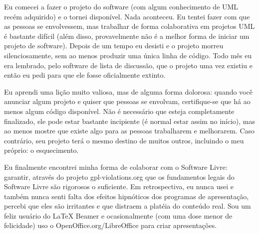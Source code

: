 Eu comecei a fazer o projeto do software (com algum conhecimento de UML recém adquirido)
e o tornei disponível. Nada aconteceu. Eu tentei fazer com que as pessoas se envolvessem,
mas trabalhar de forma colaborativa em projetos UML é bastante difícil (além disso,
provavelmente não é a melhor forma de iniciar um projeto de software). Depois de um
tempo eu desisti e o projeto morreu silenciosamente, sem ao menos produzir uma única
linha de código. Todo mês eu era lembrado, pelo software de lista de discussão, que
o projeto uma vez existiu e então eu pedi para que ele fosse oficialmente extinto.

Eu aprendi uma lição muito valiosa, mas de alguma forma dolorosa: quando você
anunciar algum projeto e quiser que pessoas se envolvam, certifique-se que há
ao menos algum código disponível. Não é necessário que esteja completamente finalizado,
ele pode estar bastante incipiente (é normal estar assim no início), mas ao menos
mostre que existe algo para as pessoas trabalharem e melhorarem. Caso contrário, seu
projeto terá o mesmo destino de muitos outros, incluindo o meu próprio: o esquecimento.

Eu finalmente encontrei minha forma de colaborar com o Software Livre: garantir, através
do projeto gpl-violations.org que os fundamentos legais do Software Livre são rigorosos
o suficiente. Em retrospectiva, eu nunca usei e também nunca senti falta dos efeitos
hipnóticos dos programas de apresentação, percebi que eles são irritantes e que distraem
a platéia do conteúdo real. Sou um feliz usuário do LaTeX Beamer e ocasionalmente (com
uma dose menor de felicidade) uso o OpenOffice.org/LibreOffice para criar apresentações.
